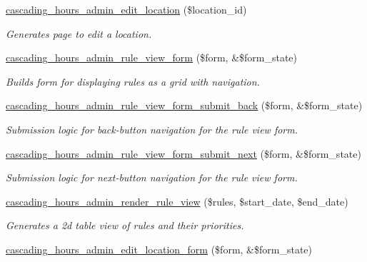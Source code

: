 \begin{DoxyCompactItemize}
\hyperlink{cascading__hours_8admin_8php_a85421c52ee7021f3d6fb7febc583a4a3_a85421c52ee7021f3d6fb7febc583a4a3}{cascading\+\_\+hours\+\_\+admin\+\_\+edit\+\_\+location} (\$location\+\_\+id)
\begin{DoxyCompactList}\small\item\em Generates page to edit a location. \end{DoxyCompactList}\item 
\hyperlink{cascading__hours_8admin_8php_a06863b3e7cefd3e270c4f417f8ade1f6_a06863b3e7cefd3e270c4f417f8ade1f6}{cascading\+\_\+hours\+\_\+admin\+\_\+rule\+\_\+view\+\_\+form} (\$form, \&\$form\+\_\+state)
\begin{DoxyCompactList}\small\item\em Builds form for displaying rules as a grid with navigation. \end{DoxyCompactList}\item 
\hyperlink{cascading__hours_8admin_8php_acf29372c7493cde569596cefec57396a_acf29372c7493cde569596cefec57396a}{cascading\+\_\+hours\+\_\+admin\+\_\+rule\+\_\+view\+\_\+form\+\_\+submit\+\_\+back} (\$form, \&\$form\+\_\+state)
\begin{DoxyCompactList}\small\item\em Submission logic for back-\/button navigation for the rule view form. \end{DoxyCompactList}\item 
\hyperlink{cascading__hours_8admin_8php_a399a1be8f2a58fb2a69fac52c09e8fe1_a399a1be8f2a58fb2a69fac52c09e8fe1}{cascading\+\_\+hours\+\_\+admin\+\_\+rule\+\_\+view\+\_\+form\+\_\+submit\+\_\+next} (\$form, \&\$form\+\_\+state)
\begin{DoxyCompactList}\small\item\em Submission logic for next-\/button navigation for the rule view form. \end{DoxyCompactList}\item 
\hyperlink{cascading__hours_8admin_8php_a86495531ad047fcd6632efeea5e1f1bb_a86495531ad047fcd6632efeea5e1f1bb}{cascading\+\_\+hours\+\_\+admin\+\_\+render\+\_\+rule\+\_\+view} (\$rules, \$start\+\_\+date, \$end\+\_\+date)
\begin{DoxyCompactList}\small\item\em Generates a 2d table view of rules and their priorities. \end{DoxyCompactList}\item 
\hyperlink{cascading__hours_8admin_8php_a8706149902213051645f6b3d5bff772e_a8706149902213051645f6b3d5bff772e}{cascading\+\_\+hours\+\_\+admin\+\_\+edit\+\_\+location\+\_\+form} (\$form, \&\$form\+\_\+state)

\end{DoxyCompactItemize}
